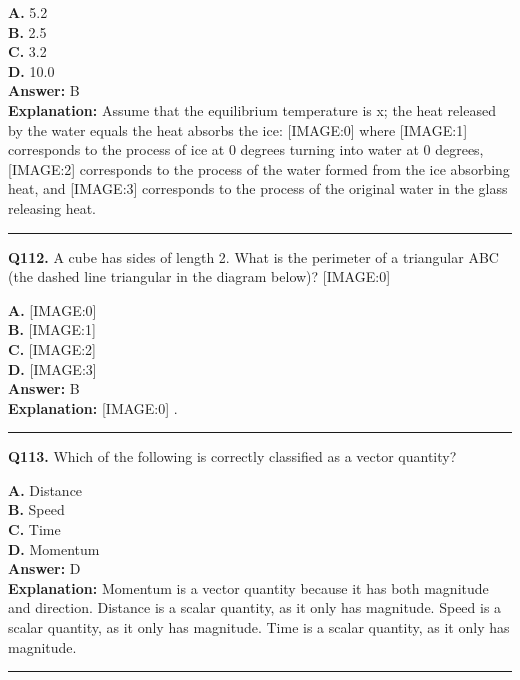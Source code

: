 \documentclass[12pt]{article}
\begin{document}
\textbf{A.} 5.2 \\
\textbf{B.} 2.5 \\
\textbf{C.} 3.2 \\
\textbf{D.} 10.0 \\

\textbf{Answer:} B \\
\textbf{Explanation:} Assume that the equilibrium temperature is x; the heat released by the water equals the heat absorbs the ice:
[IMAGE:0]
where
[IMAGE:1]
corresponds to the process of ice at 0 degrees turning into water at 0 degrees,
[IMAGE:2]
corresponds to the process of the water formed from the ice absorbing heat, and
[IMAGE:3]
corresponds to the process of the original water in the glass releasing heat.

\hrule
\vspace{1em}


\noindent
\textbf{Q112.} A cube has sides of length 2. What is the perimeter of a triangular ABC (the dashed line triangular in the diagram below)?
[IMAGE:0]



\textbf{A.} [IMAGE:0] \\
\textbf{B.} [IMAGE:1] \\
\textbf{C.} [IMAGE:2] \\
\textbf{D.} [IMAGE:3] \\

\textbf{Answer:} B \\
\textbf{Explanation:} [IMAGE:0]
.

\hrule
\vspace{1em}


\noindent
\textbf{Q113.} Which of the following is correctly classified as a vector quantity?



\textbf{A.} Distance \\
\textbf{B.} Speed \\
\textbf{C.} Time \\
\textbf{D.} Momentum \\

\textbf{Answer:} D \\
\textbf{Explanation:} Momentum is a vector quantity because it has both magnitude and direction.
Distance is a scalar quantity, as it only has magnitude.
Speed is a scalar quantity, as it only has magnitude.
Time is a scalar quantity, as it only has magnitude.

\hrule
\vspace{1em}
\end{document}
